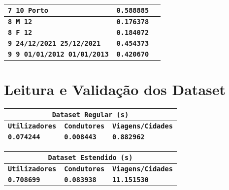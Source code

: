 \documentclass[12pt,a4paper]{report}
\begin{document}
{\begin{tabularx}{\textwidth} { 
  | >{\centering\arraybackslash}X
  | >{\centering\arraybackslash}X
  | >{\centering\arraybackslash}X | }
 \hline
 \texttt{\textbf{7 10 Porto}} & \texttt{\textbf{0.588885}} & \texttt{\textbf{}} \\
 \hline
 \texttt{\textbf{8 M 12}} & \texttt{\textbf{0.176378}} & \texttt{\textbf{}} \\
 \hline
 \texttt{\textbf{8 F 12}} & \texttt{\textbf{0.184072}} & \texttt{\textbf{}} \\
 \hline
 \texttt{\textbf{9 24/12/2021 25/12/2021}} & \vspace{-5pt}\texttt{\textbf{0.454373}} & \texttt{\textbf{}} \\
 \hline
 \texttt{\textbf{9 9 01/01/2012 01/01/2013}} & \vspace{-5pt}\texttt{\textbf{0.420670}} & \texttt{\textbf{}} \\
 \hline
 \end{tabularx}
}


\section{Leitura e Validação dos Dataset}

{
\setlength\arrayrulewidth{1pt}

\begin{center}
    \begin{tabular}{ |p{4.73cm}|p{4.73cm}|p{4.73cm}|  }
        \hline
        \multicolumn{3}{|c|}{\textbf{\texttt{Dataset Regular (s)}}} \\
        \hline
        \centering\textbf{\texttt{Utilizadores}} & \hfil \textbf{\texttt{Condutores}} & \hfil \textbf{\texttt{Viagens/Cidades}} \\
        \hline
        \centering\textbf{\texttt{0.074244}} & \hfil \texttt{\textbf{0.008443}} & \hfil \texttt{\textbf{0.882962}}\\
        \hline
    \end{tabular}
\end{center}


\begin{center}
    \begin{tabular}{ |p{4.73cm}|p{4.73cm}|p{4.73cm}|  }
        \hline
        \multicolumn{3}{|c|}{\textbf{\texttt{Dataset Estendido (s)}}} \\
        \hline
        \centering\textbf{\texttt{Utilizadores}} & \hfil \textbf{\texttt{Condutores}} & \hfil \textbf{\texttt{Viagens/Cidades}} \\
        \hline
        \centering\textbf{\texttt{0.708699}} & \hfil \texttt{\textbf{0.083938}} & \hfil \texttt{\textbf{11.151530}}\\
        \hline
    \end{tabular}
\end{center}
}
\end{document}
